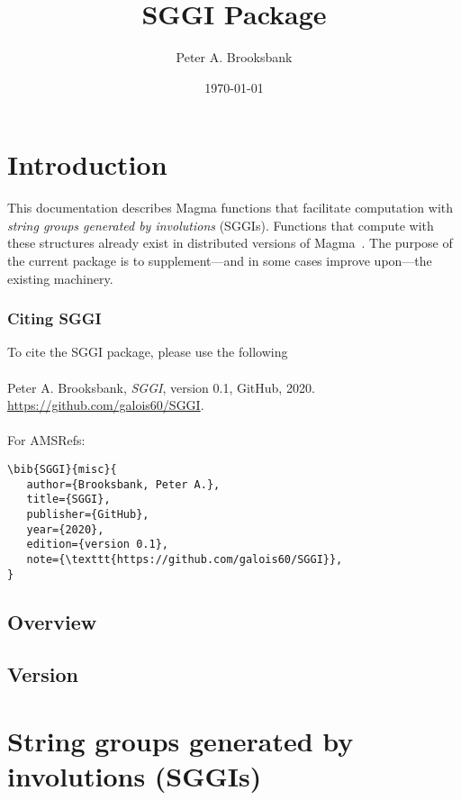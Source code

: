 \documentclass{documentation}
\title{SGGI Package}
\author{Peter A. Brooksbank}
\date{\today}
\begin{document}
\frontmatter

\dominitoc
\maketitle
\tableofcontents

\mainmatter

\chapter{Introduction}

This documentation describes {\sc Magma} functions that facilitate computation with {\em string groups generated by involutions} (SGGIs). 
Functions that compute with these structures already exist in distributed versions of {\sc Magma}~\cite{Magma}. The purpose of the 
current package is to supplement---and in some cases improve upon---the existing machinery.

\subsection*{Citing SGGI} 
To cite the SGGI package, please use the following\\
\\
Peter A. Brooksbank, \emph{SGGI}, version 0.1, GitHub, 2020. \url{https://github.com/galois60/SGGI}. \\
\\
For AMSRefs:
\begin{verbatim}
\bib{SGGI}{misc}{
   author={Brooksbank, Peter A.},
   title={SGGI},
   publisher={GitHub},
   year={2020},
   edition={version 0.1},
   note={\texttt{https://github.com/galois60/SGGI}},
}
\end{verbatim}

\section{Overview}

\section{Version}

\chapter{String groups generated by involutions (SGGIs)}
\end{document}
